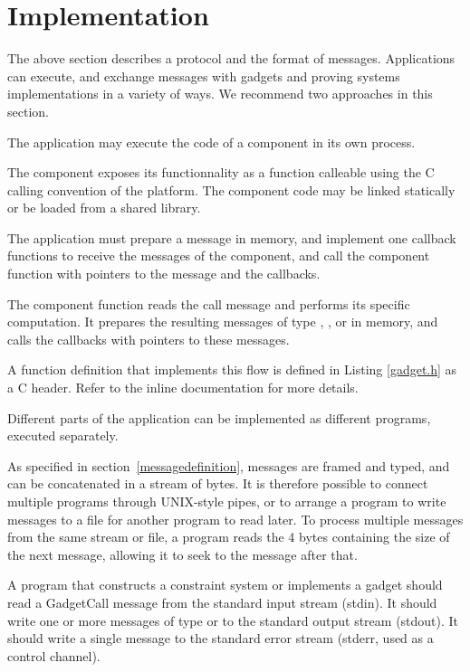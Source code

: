 \section{Implementation}
\label{sec:implementation}

The above section describes a protocol and the format of messages.
Applications can execute, and exchange messages with
gadgets and proving systems implementations in a variety of ways.
We recommend two approaches in this section.

\label{inmemory}
The application may execute the code of a component in its own process.

The component exposes its functionnality as a function calleable using the C calling convention of the platform. The component code may be linked statically or be loaded from a shared library.

The application must prepare a  message in memory, and implement one callback functions to receive the messages of the component,
and call the component function with pointers to the message and the callbacks.

The component function reads the call message and performs its specific computation. It prepares the resulting messages of type
, , or 
in memory, and calls the callbacks with pointers to these messages.

A function definition that implements this flow is defined in Listing \ref{gadget.h} as a C header. Refer to the inline documentation for more details.



Different parts of the application can be implemented as different
programs, executed separately.

As specified in section~\ref{messagedefinition}, messages are framed and typed,
and can be concatenated in a stream of bytes. It is therefore possible to connect multiple programs through UNIX-style pipes, or to arrange a program to write messages to a file for another program to read later.
To process multiple messages from the same stream or file, a program
reads the 4 bytes containing the size of the next message, allowing it to seek
to the message after that.

A program that constructs a constraint system or implements a gadget should read a GadgetCall message from the standard input stream (stdin).
It should write one or more messages of type
 or 
to the standard output stream (stdout).
It should write a single  message to the standard error stream
(stderr, used as a control channel).

